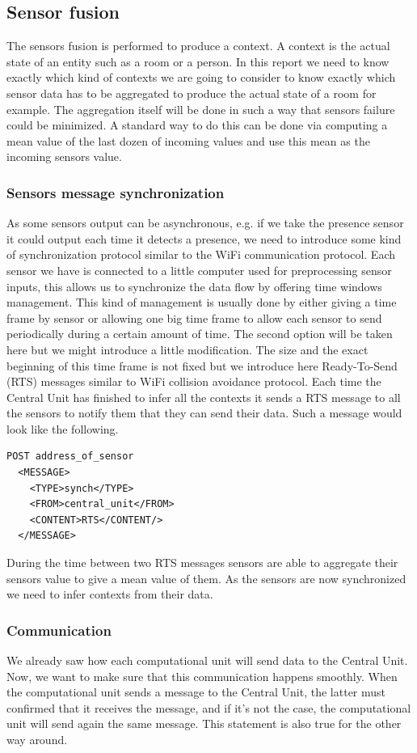 \documentclass{acm_proc_article-sp}
\begin{document}
\subsection{Sensor fusion}
The sensors fusion is performed to produce a context. A context is the actual state of an entity such as a room or a person. 
In this report we need to know exactly which kind of contexts we are going to consider to know exactly which sensor data has to be aggregated to produce the actual state of a room for example. 
The aggregation itself will be done in such a way that sensors failure could be minimized.
A standard way to do this can be done via computing a mean value of the last dozen of incoming values and use this mean as the incoming sensors value.
\subsubsection{Sensors message synchronization}
As some sensors output can be asynchronous, e.g. if we take the presence sensor it could output each time it detects a presence, we need to introduce some kind of synchronization protocol similar to the WiFi communication protocol.
Each sensor we have is connected to a little computer used for preprocessing sensor inputs, this allows us to synchronize the data flow by offering time windows management.
This kind of management is usually done by either giving a time frame by sensor or allowing one big time frame to allow each sensor to send periodically during a certain amount of time.
The second option will be taken here but we might introduce a little modification. 
The size and the exact beginning of this time frame is not fixed but we introduce here Ready-To-Send (RTS) messages similar to WiFi collision avoidance protocol.
Each time the Central Unit has finished to infer all the contexts it sends a RTS message to all the sensors to notify them that they can send their data.
Such a message would look like the following.
\begin{verbatim}
POST address_of_sensor 
  <MESSAGE>
    <TYPE>synch</TYPE>
    <FROM>central_unit</FROM>
    <CONTENT>RTS</CONTENT/>
  </MESSAGE> 
\end{verbatim}
During the time between two RTS messages sensors are able to aggregate their sensors value to give a mean value of them.
As the sensors are now synchronized we need to infer contexts from their data.
\subsubsection{Communication}
We already saw how each computational unit will send data to the Central Unit. Now, we want to make sure that this communication happens smoothly. 
When the computational unit sends a message to the Central Unit, the latter must confirmed that it receives the message, and if it's not the case, 
the computational unit will send again the same message. 
This statement is also true for the other way around. 
\end{document}
